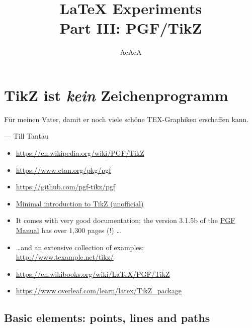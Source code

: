 \documentclass[]{article}
\title{\LaTeX{} Experiments\\ Part III: PGF/TikZ}
\author{AeAeA}
\begin{document}
\maketitle

\section{TikZ ist {\itshape kein} Zeichenprogramm}

\epigraph
{Für meinen Vater, damit er noch viele schöne TEX-Graphiken erschaffen kann.}
{--- \textup{Till Tantau}}


\begin{itemize}
    \item \url{https://en.wikipedia.org/wiki/PGF/TikZ}
    \item \url{https://www.ctan.org/pkg/pgf}
    \item \url{https://github.com/pgf-tikz/pgf}
    \item \href{http://cremeronline.com/LaTeX/minimaltikz.pdf}
               {Minimal introduction to TikZ (unofficial)}
    \item  It comes with very good documentation; the version 3.1.5b of the 
           \href{http://mirrors.ctan.org/graphics/pgf/base/doc/pgfmanual.pdf}
                {PGF Manual} has over 1,300 pages (!) \ldots
    \item \ldots and an extensive collection of examples: \\
          \url{http://www.texample.net/tikz/}
    \item \url{https://en.wikibooks.org/wiki/LaTeX/PGF/TikZ}
    \item \url{https://www.overleaf.com/learn/latex/TikZ_package}
\end{itemize}

\subsection{Basic elements: points, lines and paths}

\end{document}
